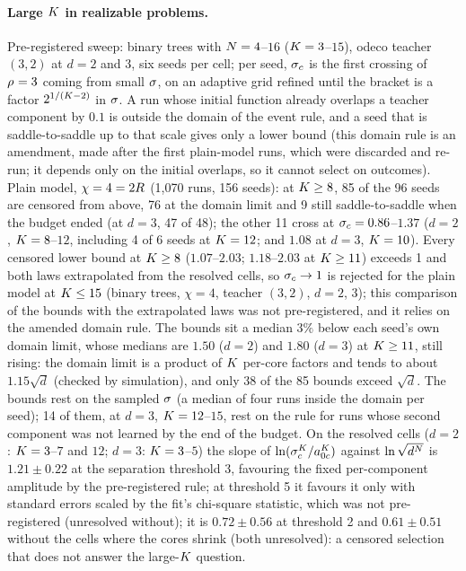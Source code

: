 \paragraph{Large $K$ in realizable problems.}
\empirical{} \newresult{} Pre-registered sweep: binary trees with $N=4$--$16$ ($K=3$--$15$), odeco teacher $(3,2)$ at
$d=2$ and $3$, six seeds per cell; per seed, $\sigma_c$ is the first crossing of $\rho_{}=3$ coming from small $\sigma$, on
an adaptive grid refined until the bracket is a factor $2^{1/(K-2)}$ in $\sigma$. A run whose initial function
already overlaps a teacher component by $0.1$ is outside the domain of the event rule, and a seed that is
saddle-to-saddle up to that scale gives only a lower bound (this domain rule is an amendment, made after the
first plain-model runs, which were discarded and re-run; it depends only on the initial overlaps, so it cannot
select on outcomes). Plain model, $\chi=4=2R$ (1,070 runs, 156 seeds): at
$K\ge8$, 85 of the 96 seeds are censored from above, 76 at the domain limit and 9 still saddle-to-saddle when the
budget ended (at $d=3$, 47 of 48); the other 11 cross at $\sigma_c=0.86$--$1.37$ ($d=2$, $K=8$--$12$, including 4 of 6
seeds at $K=12$; and $1.08$ at $d=3$, $K=10$). Every censored lower bound at $K\ge8$ ($1.07$--$2.03$;
$1.18$--$2.03$ at $K\ge11$) exceeds 1 and both laws extrapolated from the resolved cells, so $\sigma_c\to1$ is rejected
for the plain model at $K\le15$ (binary trees, $\chi=4$, teacher $(3,2)$, $d=2$, $3$); this comparison of the bounds
with the extrapolated laws was not pre-registered, and it relies on the amended domain rule. The bounds sit a median $3\%$ below each seed's own domain limit, whose medians are
$1.50$ ($d=2$) and $1.80$ ($d=3$) at $K\ge11$, still rising: the domain limit is a product of $K$ per-core factors
and tends to about $1.15\sqrt d$ \derived{} (checked by simulation), and only 38 of the 85 bounds exceed $\sqrt d$.
The bounds rest on the sampled $\sigma$ (a median of four runs inside the domain per seed); 14 of them, at $d=3$,
$K=12$--$15$, rest on the rule for runs whose second component was not learned by the end of the budget. On the
resolved cells ($d=2$: $K=3$--$7$ and $12$; $d=3$: $K=3$--$5$) the slope of $\ln(\sigma_c^K/a_{0c}^K)$ against
$\ln\sqrt{d^N}$ is $1.21\pm0.22$ at the separation threshold 3, favouring the fixed per-component amplitude by the
pre-registered rule; at threshold 5 it favours it only with standard errors scaled by the fit's chi-square statistic, which was
not pre-registered (unresolved without); it is $0.72\pm0.56$ at threshold 2 and $0.61\pm0.51$ without the cells where
the cores shrink (both unresolved): a censored selection that does not answer the large-$K$ question.

